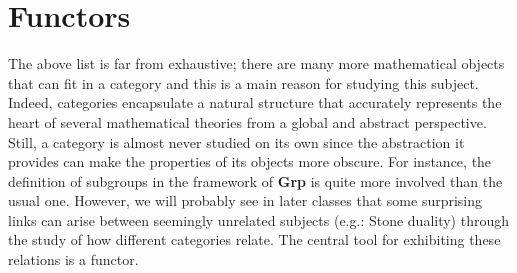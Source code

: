 \documentclass{article}
\theoremstyle{definition}
\theoremstyle{remark}
\begin{document}
\section{Functors}
The above list is far from exhaustive; there are many more mathematical objects that can fit in a category and this is a main reason for studying this subject. Indeed, categories encapsulate a natural structure that accurately represents the heart of several mathematical theories from a global and abstract perspective. Still, a category is almost never studied on its own since the abstraction it provides can make the properties of its objects more obscure. For instance, the definition of subgroups in the framework of \textbf{Grp} is quite more involved than the usual one. However, we will probably see in later classes that some surprising links can arise between seemingly unrelated subjects (e.g.: Stone duality) through the study of how different categories relate. The central tool for exhibiting these relations is a functor.
\end{document}
